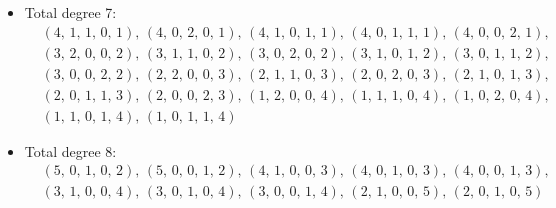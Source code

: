 \documentclass[12pt,reqno]{amsart}
\theoremstyle{definition}
\theoremstyle{remark}
\begin{document}
\begin{itemize}
{\begin{align*}
    &\left(1,\,1,\,1,\,1,\,2\right),\,\left(0,\,2,\,1,\,1,\,2\right),\,\left(1,\,0,\,2,\,1,\,2\right),\,\left(0,\,1,\,2,\,1,\,2\right),\,\left(0,\,0,\,3,\,1,\,2\right),\\
    &\left(1,\,1,\,0,\,2,\,2\right),\,\left(0,\,2,\,0,\,2,\,2\right),\,\left(1,\,0,\,1,\,2,\,2\right),\,\left(0,\,1,\,1,\,2,\,2\right),\,\left(0,\,0,\,2,\,2,\,2\right),\\
    &\left(1,\,0,\,0,\,3,\,2\right),\,\left(0,\,1,\,0,\,3,\,2\right),\,\left(0,\,0,\,1,\,3,\,2\right),\,\left(0,\,3,\,0,\,0,\,3\right),\,\left(0,\,2,\,1,\,0,\,3\right),\\
    &\left(0,\,1,\,2,\,0,\,3\right),\,\left(0,\,0,\,3,\,0,\,3\right),\,\left(0,\,2,\,0,\,1,\,3\right),\,\left(0,\,1,\,1,\,1,\,3\right),\,\left(0,\,0,\,2,\,1,\,3\right),\\
    &\left(0,\,1,\,0,\,2,\,3\right),\,\left(0,\,0,\,1,\,2,\,3\right)
    \end{align*}}%
    \item Total degree 7:
    {\tiny\begin{align*}
    &\left(4,\,1,\,1,\,0,\,1\right),\,\left(4,\,0,\,2,\,0,\,1\right),\,\left(4,\,1,\,0,\,1,\,1\right),\,\left(4,\,0,\,1,\,1,\,1\right),\,\left(4,\,0,\,0,\,2,\,1\right),\\
    &\left(3,\,2,\,0,\,0,\,2\right),\,\left(3,\,1,\,1,\,0,\,2\right),\,\left(3,\,0,\,2,\,0,\,2\right),\,\left(3,\,1,\,0,\,1,\,2\right),\,\left(3,\,0,\,1,\,1,\,2\right),\\
    &\left(3,\,0,\,0,\,2,\,2\right),\,\left(2,\,2,\,0,\,0,\,3\right),\,\left(2,\,1,\,1,\,0,\,3\right),\,\left(2,\,0,\,2,\,0,\,3\right),\,\left(2,\,1,\,0,\,1,\,3\right),\\
    &\left(2,\,0,\,1,\,1,\,3\right),\,\left(2,\,0,\,0,\,2,\,3\right),\,\left(1,\,2,\,0,\,0,\,4\right),\,\left(1,\,1,\,1,\,0,\,4\right),\,\left(1,\,0,\,2,\,0,\,4\right),\\
    &\left(1,\,1,\,0,\,1,\,4\right),\,\left(1,\,0,\,1,\,1,\,4\right)
    \end{align*}}
    \item Total degree 8: 
    {\tiny\begin{align*}
    &\left(5,\,0,\,1,\,0,\,2\right),\,\left(5,\,0,\,0,\,1,\,2\right),\,\left(4,\,1,\,0,\,0,\,3\right),\,\left(4,\,0,\,1,\,0,\,3\right),\,\left(4,\,0,\,0,\,1,\,3\right),\\
    &\left(3,\,1,\,0,\,0,\,4\right),\,\left(3,\,0,\,1,\,0,\,4\right),\,\left(3,\,0,\,0,\,1,\,4\right),\,\left(2,\,1,\,0,\,0,\,5\right),\,\left(2,\,0,\,1,\,0,\,5\right)
    \end{align*}}
\end{itemize}
\end{document}
